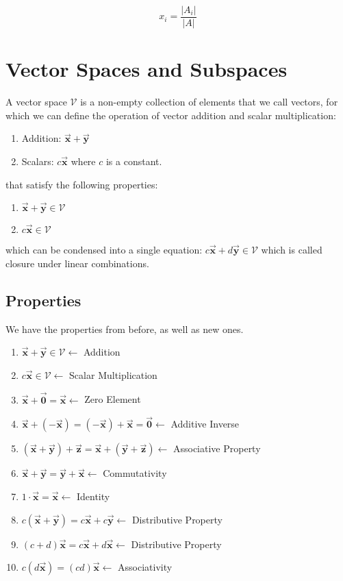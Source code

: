 \documentclass[12pt,landscape,twocolumn]{article}
\let\oldvec\vec
\renewcommand{\vec}[1]{\oldvec{\mathbf{ #1 } } }                    %
\begin{document}
        \begin{equation}\label{eq:cramer}
            x_i = \frac{|A_i|}{|A|}
        \end{equation}


\section{Vector Spaces and Subspaces}
A vector space $\mathcal{V}$ is a non-empty collection of elements that we call vectors, for which we can define the operation of vector addition and scalar multiplication:
    \begin{enumerate}
    \item Addition: $\vec{x} + \vec{y}$
    \item Scalars: $c \vec{x}$ where $c$ is a constant.
    \end{enumerate}
that satisfy the following properties:
    \begin{enumerate}
    \item $\vec{x} + \vec{y} \in \mathcal{V}$
    \item $c \vec{x} \in \mathcal{V}$
    \end{enumerate}

which can be condensed into a single equation:
$
    c\vec{x} + d\vec{y} \in \mathcal{V}
$
which is called closure under linear combinations.

    \subsection{Properties}
    We have the properties from before, as well as new ones.

    \begin{enumerate}
    \item $\vec{x} + \vec{y} \in \mathcal{V} \leftarrow $ Addition
    \item $c \vec{x} \in \mathcal{V} \leftarrow $ Scalar Multiplication
    \item $\vec{x} + \vec{0} = \vec{x} \leftarrow $ Zero Element
    \item $\vec{x} + (-\vec{x}) = (-\vec{x}) + \vec{x} = \vec{0} \leftarrow $ Additive Inverse
    \item $(\vec{x} + \vec{y}) + \vec{z} = \vec{x} + (\vec{y} + \vec{z}) \leftarrow$ Associative Property
    \item $\vec{x} + \vec{y} = \vec{y} + \vec{x} \leftarrow $ Commutativity
    \item $1 \cdot \vec{x} = \vec{x} \leftarrow$ Identity
    \item $c (\vec{x} + \vec{y}) = c\vec{x} + c\vec{y} \leftarrow $ Distributive Property
    \item $(c + d) \vec{x} = c\vec{x} + d\vec{x} \leftarrow $ Distributive Property
    \item $c(d\vec{x}) = (cd)\vec{x} \leftarrow $ Associativity
    \end{enumerate}
\end{document}
